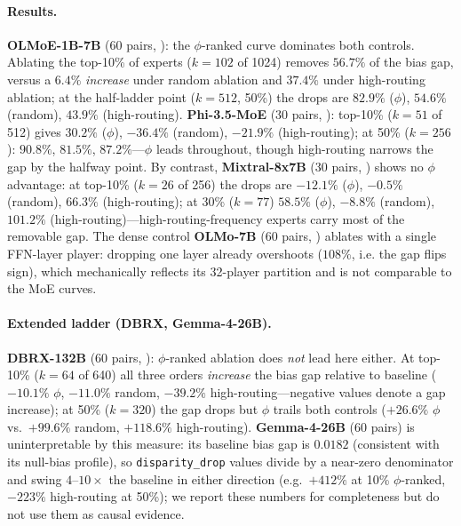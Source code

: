 \documentclass[sigconf]{acmart}
\begin{document}
\paragraph{Results.}
\textbf{OLMoE-1B-7B} (60 pairs, ): the
$\phi$-ranked curve dominates both controls. Ablating the top-10\% of
experts ($k{=}102$ of 1024) removes $56.7\%$ of the bias gap, versus a
$6.4\%$ \emph{increase} under random ablation and $37.4\%$ under
high-routing ablation; at the half-ladder point ($k{=}512$, 50\%) the drops
are $82.9\%$ ($\phi$), $54.6\%$ (random), $43.9\%$ (high-routing).
\textbf{Phi-3.5-MoE} (30 pairs, ): top-10\%
($k{=}51$ of 512) gives $30.2\%$ ($\phi$), $-36.4\%$ (random), $-21.9\%$
(high-routing); at 50\% ($k{=}256$): $90.8\%$, $81.5\%$, $87.2\%$---$\phi$
leads throughout, though high-routing narrows the gap by the halfway point.
By contrast, \textbf{Mixtral-8x7B} (30 pairs,
) shows no $\phi$ advantage: at
top-10\% ($k{=}26$ of 256) the drops are $-12.1\%$ ($\phi$), $-0.5\%$
(random), $66.3\%$ (high-routing); at 30\% ($k{=}77$) $58.5\%$ ($\phi$),
$-8.8\%$ (random), $101.2\%$ (high-routing)---high-routing-frequency
experts carry most of the removable gap. The dense control
\textbf{OLMo-7B} (60 pairs, ) ablates
with a single FFN-layer player: dropping one layer already overshoots
($108\%$, i.e. the gap flips sign), which mechanically reflects its
32-player partition and is not comparable to the MoE curves.
\paragraph{Extended ladder (DBRX, Gemma-4-26B).}
\textbf{DBRX-132B} (60 pairs, ): $\phi$-ranked
ablation does \emph{not} lead here either. At top-10\% ($k{=}64$ of 640)
all three orders \emph{increase} the bias gap relative to baseline
($-10.1\%$ $\phi$, $-11.0\%$ random, $-39.2\%$ high-routing---negative
values denote a gap increase); at 50\% ($k{=}320$) the gap drops but
$\phi$ trails both controls ($+26.6\%$ $\phi$ vs.\ $+99.6\%$ random,
$+118.6\%$ high-routing). \textbf{Gemma-4-26B} (60 pairs) is
uninterpretable by this measure: its baseline bias gap is $0.0182$
(consistent with its null-bias profile), so \texttt{disparity\_drop} values
divide by a near-zero denominator and swing $4$--$10\times$ the baseline
in either direction (e.g.\ $+412\%$ at 10\% $\phi$-ranked, $-223\%$
high-routing at 50\%); we report these numbers for completeness but do
not use them as causal evidence.
\end{document}
